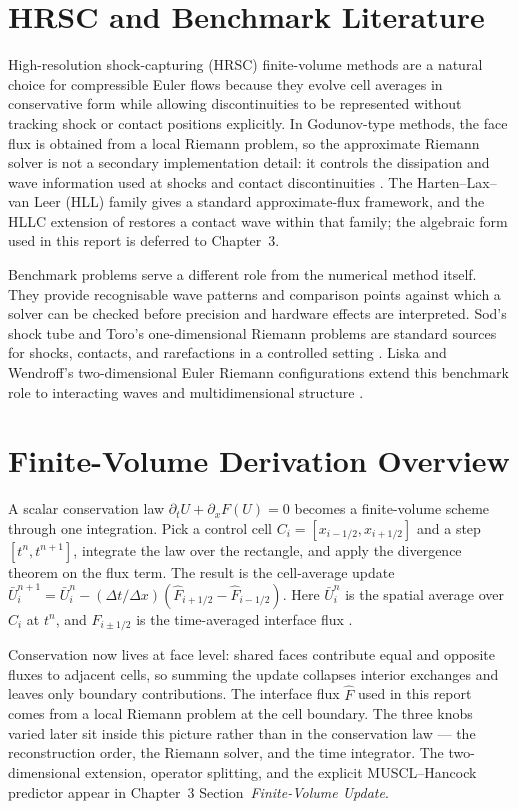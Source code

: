\section{HRSC and Benchmark Literature}
High-resolution shock-capturing (HRSC) finite-volume methods are a natural
choice for compressible Euler flows because they evolve cell averages in
conservative form while allowing discontinuities to be represented without
tracking shock or contact positions explicitly. In Godunov-type methods, the
face flux is obtained from a local Riemann problem, so the approximate Riemann
solver is not a secondary implementation detail: it controls the dissipation
and wave information used at shocks and contact discontinuities
\citep{toro2009,harten_lax_vanleer_1983}. The Harten--Lax--van Leer (HLL)
family gives a standard approximate-flux framework, and the HLLC extension of
\citet{toro_spruce_speares_1994} restores a contact wave within that family;
the algebraic form used in this report is deferred to Chapter~3.

Benchmark problems serve a different role from the numerical method itself.
They provide recognisable wave patterns and comparison points against which a
solver can be checked before precision and hardware effects are interpreted.
Sod's shock tube and Toro's one-dimensional Riemann problems are standard
sources for shocks, contacts, and rarefactions in a controlled setting
\citep{sod_1978,toro2009}. Liska and Wendroff's two-dimensional Euler Riemann
configurations extend this benchmark role to interacting waves and
multidimensional structure \citep{liska_wendroff_2003}.

\section{Finite-Volume Derivation Overview}
A scalar conservation law $\partial_t U + \partial_x F(U) = 0$ becomes a finite-volume scheme through one integration. Pick a control cell $C_i = [x_{i-1/2}, x_{i+1/2}]$ and a step $[t^n, t^{n+1}]$, integrate the law over the rectangle, and apply the divergence theorem on the flux term. The result is the cell-average update $\bar U_i^{n+1} = \bar U_i^n - (\Delta t/\Delta x)(\widehat F_{i+1/2} - \widehat F_{i-1/2})$. Here $\bar U_i^n$ is the spatial average over $C_i$ at $t^n$, and $\widehat F_{i \pm 1/2}$ is the time-averaged interface flux \citep{toro2009,leveque_2002}.

Conservation now lives at face level: shared faces contribute equal and opposite fluxes to adjacent cells, so summing the update collapses interior exchanges and leaves only boundary contributions. The interface flux $\widehat F$ used in this report comes from a local Riemann problem at the cell boundary. The three knobs varied later sit inside this picture rather than in the conservation law --- the reconstruction order, the Riemann solver, and the time integrator. The two-dimensional extension, operator splitting, and the explicit MUSCL--Hancock predictor appear in Chapter~3 Section~\emph{Finite-Volume Update}.

